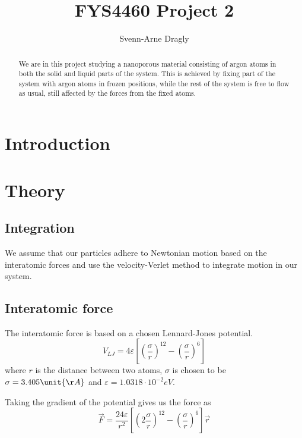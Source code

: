 \documentclass[reprint,floatfix,amsmath,amssymb,aps,pra]{revtex4-1}
\begin{document}
\title{FYS4460 Project 2}
\author{Svenn-Arne Dragly}

\begin{abstract}
We are in this project studying a nanoporous material consisting of argon atoms in both the solid and liquid parts of the system. This is achieved by fixing part of the system with argon atoms in frozen positions, while the rest of the system is free to flow as usual, still affected by the forces from the fixed atoms.
\end{abstract}

\maketitle

\section{Introduction}



\section{Theory}

\subsection{Integration}

We assume that our particles adhere to Newtonian motion based on the interatomic forces and use the velocity-Verlet method to integrate motion in our system.

\subsection{Interatomic force}

The interatomic force is based on a chosen Lennard-Jones potential.
\begin{equation}
    V_{LJ} = 4 \varepsilon \left[ \left( \frac {\sigma} {r} \right)^{12} - \left( \frac {\sigma} {r} \right)^6 \right]
\end{equation}
where $r$ is the distance between two atoms, $\sigma$ is chosen to be $\sigma = 3.405 \unit{\AA}$ and $\varepsilon = 1.0318 \cdot 10^{−2} \unit{eV}$.

Taking the gradient of the potential gives us the force as
\begin{equation}
 \vec F = \frac{24 \varepsilon}{r^{2}} \left[ \left( 2 \frac {\sigma} {r} \right)^{12} - \left( \frac {\sigma} {r} \right)^6 \right] \vec r
\end{equation}
\end{document}
